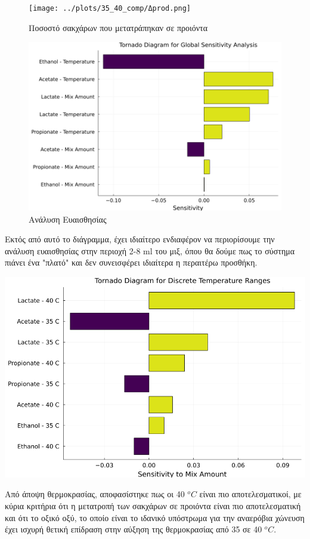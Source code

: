 \documentclass[11pt]{article}
\begin{document}
\begin{figure}[htbp]
\centering
\texttt{[image: ../plots/35\_40\_comp/Δprod.png]}
\caption{Ποσοστό σακχάρων που μετατράπηκαν σε προιόντα}
\end{figure}

\begin{figure}[htbp]
\centering
\includegraphics[width=.9\linewidth]{../plots/sensitivity/global_tornado.png}
\caption{Ανάλυση Ευαισθησίας}
\end{figure}

Εκτός από αυτό το διάγραμμα, έχει ιδιαίτερο ενδιαφέρον να περιορίσουμε την ανάλυση ευαισθησίας στην περιοχή 2-8 ml του μιξ, όπου θα δούμε πως το σύστημα πιάνει ένα "πλατό" και δεν συνεισφέρει ιδιαίτερα η περαιτέρω προσθήκη.

\begin{center}
\includegraphics[width=.9\linewidth]{../plots/sensitivity/temperature_tornado.png}
\end{center}

Από άποψη θερμοκρασίας, αποφασίστηκε πως οι 40 \(^oC\) είναι πιο αποτελεσματικοί, με κύρια κριτήρια ότι η μετατροπή των σακχάρων σε προιόντα είναι πιο αποτελεσματική και ότι το οξικό οξύ, το οποίο είναι το ιδανικό υπόστρωμα για την αναερόβια χώνευση έχει ισχυρή θετική επίδραση στην αύξηση της θερμοκρασίας από 35 σε 40 \(^oC\).
\end{document}
